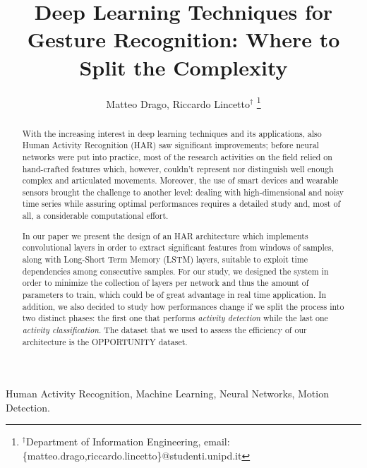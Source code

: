 \documentclass[10pt, conference, journal]{IEEEtran}
\title{Deep Learning Techniques for Gesture Recognition: Where to Split the Complexity}
\author{Matteo Drago, Riccardo Lincetto$^\dag$
\thanks{$^\dag$Department of Information Engineering, email: \{matteo.drago,riccardo.lincetto\}@studenti.unipd.it}
}
\begin{document}
\maketitle

\begin{abstract}
	
With the increasing interest in deep learning techniques and its applications, also Human Activity Recognition (HAR) saw significant improvements; before neural networks were put into practice, most of the research activities on the field relied on hand-crafted features which, however, couldn't represent nor distinguish well enough complex and articulated movements. Moreover, the use of smart devices and wearable sensors brought the challenge to another level: dealing with high-dimensional and noisy time series while assuring optimal performances requires a detailed study and, most of all, a considerable computational effort.

In our paper we present the design of an HAR architecture which implements convolutional layers in order to extract significant features from windows of samples, along with Long-Short Term Memory (LSTM) layers, suitable to exploit time dependencies among consecutive samples. For our study, we designed the system in order to minimize the collection of layers per network and thus the amount of parameters to train, which could be of great advantage in real time application. In addition, we also decided to study how performances change if we split the process into two distinct phases: the first one that performs \textit{activity detection} while the last one \textit{activity classification}. The dataset that we used to assess the efficiency of our architecture is the OPPORTUNITY dataset.

\end{abstract}

\IEEEkeywords
Human Activity Recognition, Machine Learning, Neural Networks, Motion Detection. 
\endIEEEkeywords













\end{document}
